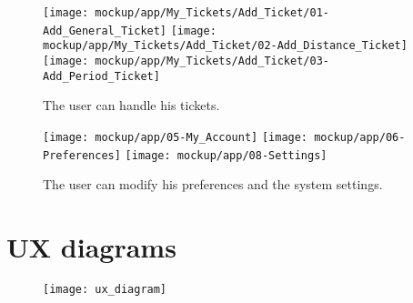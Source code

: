 	\begin{figure}[H]
		\texttt{[image: mockup/app/My\_Tickets/Add\_Ticket/01-Add\_General\_Ticket]}
		\hspace{.3cm}
		\texttt{[image: mockup/app/My\_Tickets/Add\_Ticket/02-Add\_Distance\_Ticket]}
		\hspace{.3cm}
		\texttt{[image: mockup/app/My\_Tickets/Add\_Ticket/03-Add\_Period\_Ticket]}
		\centering 
		\caption{The user can handle his tickets.}
	\end{figure}
	
	\begin{figure}[H]
		\texttt{[image: mockup/app/05-My\_Account]}
		\hspace{.3cm}
		\texttt{[image: mockup/app/06-Preferences]}
		\hspace{.3cm}
		\texttt{[image: mockup/app/08-Settings]}
		\centering 
		\caption{The user can modify his preferences and the system settings.}
	\end{figure}

\section{UX diagrams}
\label{subsect:UX diagrams}

	\begin{figure}[H]
		\texttt{[image: ux\_diagram]}
		\centering
	\end{figure}